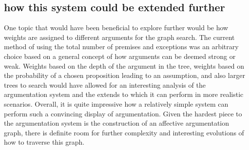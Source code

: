 \documentclass[10pt,a4paper,twocolumn]{article}
\begin{document}
\subsection{how this system could be extended further}
One topic that would have been beneficial to explore further would be how weights
are assigned to different arguments for the graph search. The current method of
using the total number of premises and exceptions was an arbitrary choice based
on a general concept of how arguments can be deemed strong or weak. Weights
based on the depth of the argument in the tree, weights based on the probability of a chosen
proposition leading to an assumption, and also larger trees to search would have
allowed for an interesting analysis of the argumentation system and the extends
to which it can perform in more realistic scenarios. Overall, it is quite
impressive how a relatively simple system can perform such a convincing display
of argumentation. Given the hardest piece to the argumentation system is the
construction of an affective argumentation graph, there is definite room for
further complexity and interesting evolutions of how to traverse this graph.

%


\end{document}
